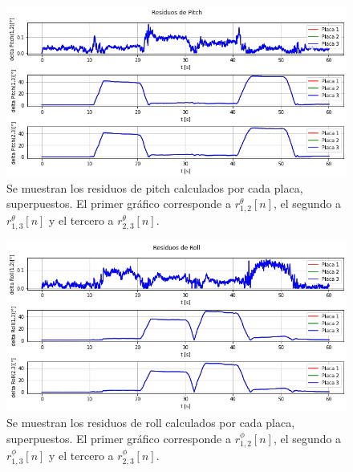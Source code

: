 \begin{figure}[htb]
    \centering
    \includegraphics[width=\textwidth]{img/resultados_residuos_pitch_enclavado.png}
    \caption{Se muestran los residuos de pitch calculados por cada placa, superpuestos. El primer gráfico corresponde a $r_{1,2}^{\theta}[n]$, el segundo a $r_{1,3}^{\theta}[n]$ y el tercero a $r_{2,3}^{\theta}[n]$.}
    \label{fig:resultados_residuos_pitch_enclavado}
\end{figure}

\begin{figure}
    \centering
    \includegraphics[width=\textwidth]{img/resultados_residuos_roll_enclavado.png}
    \caption{Se muestran los residuos de roll calculados por cada placa, superpuestos. El primer gráfico corresponde a $r_{1,2}^{\phi}[n]$, el segundo a $r_{1,3}^{\phi}[n]$ y el tercero a $r_{2,3}^{\phi}[n]$.}
    \label{fig:resultados_residuos_roll_enclavado}
\end{figure}



